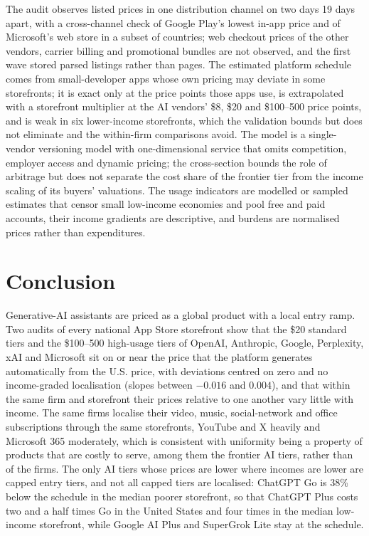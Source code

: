 \documentclass[11pt]{article}
\theoremstyle{definition}
\theoremstyle{remark}
\begin{document}
The audit observes listed prices in one distribution channel on two days 19 days apart, with a cross-channel check of Google Play's lowest in-app price and of Microsoft's web store in a subset of countries; web checkout prices of the other vendors, carrier billing and promotional bundles are not observed, and the first wave stored parsed listings rather than pages. The estimated platform schedule comes from small-developer apps whose own pricing may deviate in some storefronts; it is exact only at the price points those apps use, is extrapolated with a storefront multiplier at the AI vendors' \$8, \$20 and \$100--500 price points, and is weak in six lower-income storefronts, which the validation bounds but does not eliminate and the within-firm comparisons avoid. The model is a single-vendor versioning model with one-dimensional service that omits competition, employer access and dynamic pricing; the cross-section bounds the role of arbitrage but does not separate the cost share of the frontier tier from the income scaling of its buyers' valuations. The usage indicators are modelled or sampled estimates that censor small low-income economies and pool free and paid accounts, their income gradients are descriptive, and burdens are normalised prices rather than expenditures.

\section{Conclusion}\label{sec:conclusion}

Generative-AI assistants are priced as a global product with a local entry ramp. Two audits of every national App Store storefront show that the \$20 standard tiers and the \$100--500 high-usage tiers of OpenAI, Anthropic, Google, Perplexity, xAI and Microsoft sit on or near the price that the platform generates automatically from the U.S. price, with deviations centred on zero and no income-graded localisation (slopes between $-0.016$ and $0.004$), and that within the same firm and storefront their prices relative to one another vary little with income. The same firms localise their video, music, social-network and office subscriptions through the same storefronts, YouTube and X heavily and Microsoft 365 moderately, which is consistent with uniformity being a property of products that are costly to serve, among them the frontier AI tiers, rather than of the firms. The only AI tiers whose prices are lower where incomes are lower are capped entry tiers, and not all capped tiers are localised: ChatGPT Go is 38\% below the schedule in the median poorer storefront, so that ChatGPT Plus costs two and a half times Go in the United States and four times in the median low-income storefront, while Google AI Plus and SuperGrok Lite stay at the schedule. 
\end{document}

